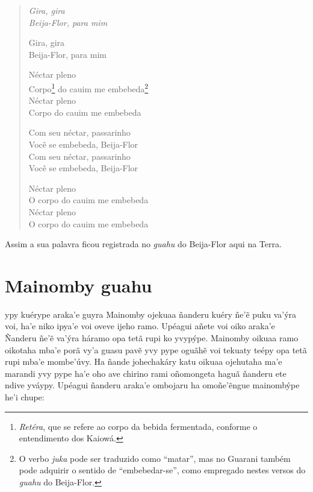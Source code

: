 \begin{verse}
\itshape
Gira, gira\\
Beija-Flor, para mim

Gira, gira\\
Beija-Flor, para mim

Néctar pleno\\
Corpo\footnote{\emph{Retéra}, que se refere ao corpo da bebida fermentada, conforme o entendimento dos Kaiowá.} do cauim me embebeda\footnote{O verbo \emph{juka} pode ser traduzido como ``matar'', mas no Guarani também pode adquirir o sentido de ``embebedar-se'', como empregado nestes versos do \emph{guahu} do Beija-Flor.}\\
Néctar pleno\\
Corpo do cauim me embebeda

Com seu néctar, passarinho\\
Você se embebeda, Beija-Flor\\
Com seu néctar, passarinho\\
Você se embebeda, Beija-Flor

Néctar pleno\\
O corpo do cauim me embebeda\\
Néctar pleno\\
O corpo do cauim me embebeda
\end{verse}

Assim a sua palavra ficou registrada no \emph{guahu} do Beija-Flor aqui na Terra.

\chapter{Mainomby guahu}

 ypy kuérype araka'e guyra Mainomby ojekuaa ñanderu kuéry ñe'ẽ puku
va'ýra voi, ha'e niko ipya'e voi oveve ijeho ramo. Upéagui añete voi
oiko araka'e Ñanderu ñe'ẽ va'ýra háramo opa tetã rupi ko yvypýpe.
Mainomby oikuaa ramo oikotaha mba'e porã vy'a guasu pavẽ yvy pype oguãhẽ
voi tekuaty teépy opa tetã rupi mba'e mombe'úvy. Ha ñande johechakáry
katu oikuaa ojehutaha ma'e marandi yvy pype ha'e oho ave chirino rami
oñomongeta haguã ñanderu ete ndive yváypy. Upéagui ñanderu araka'e
ombojaru ha omoñe'ẽngue mainombýpe he'i chupe:

